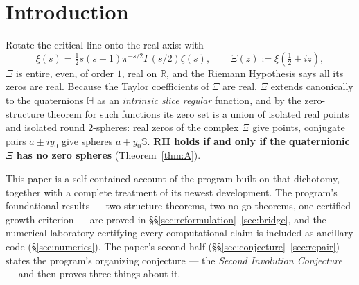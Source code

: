 \documentclass[11pt]{amsart}
\theoremstyle{plain}
\theoremstyle{definition}
\theoremstyle{remark}
\newcommand{\HH}{\mathbb{H}}
\newcommand{\RR}{\mathbb{R}}
\renewcommand{\SS}{\mathbb{S}}
\begin{document}
\maketitle
\setcounter{tocdepth}{1}
\tableofcontents

\section{Introduction}\label{sec:intro}

Rotate the critical line onto the real axis: with
\[
\xi(s)=\tfrac12 s(s-1)\pi^{-s/2}\Gamma(s/2)\zeta(s),\qquad
\Xi(z):=\xi\!\left(\tfrac12+iz\right),
\]
$\Xi$ is entire, even, of order $1$, real on $\RR$, and the Riemann Hypothesis says all its zeros
are real. Because the Taylor coefficients of $\Xi$ are real, $\Xi$ extends canonically to the
quaternions $\HH$ as an \emph{intrinsic slice regular} function, and by the zero-structure theorem
for such functions its zero set is a union of isolated real points and isolated round $2$-spheres:
real zeros of the complex $\Xi$ give points, conjugate pairs $a\pm iy_0$ give spheres $a+y_0\SS$.
\textbf{RH holds if and only if the quaternionic $\Xi$ has no zero spheres} (Theorem~\ref{thm:A}).

This paper is a self-contained account of the program built on that dichotomy, together with a
complete treatment of its newest development. The program's foundational results --- two structure
theorems, two no-go theorems, one certified growth criterion --- are proved in
\S\S\ref{sec:reformulation}--\ref{sec:bridge}, and the numerical laboratory certifying every
computational claim is included as ancillary code (\S\ref{sec:numerics}). The paper's second half
(\S\S\ref{sec:conjecture}--\ref{sec:repair}) states the program's organizing conjecture --- the
\emph{Second Involution Conjecture} --- and then proves three things about it.
\end{document}

